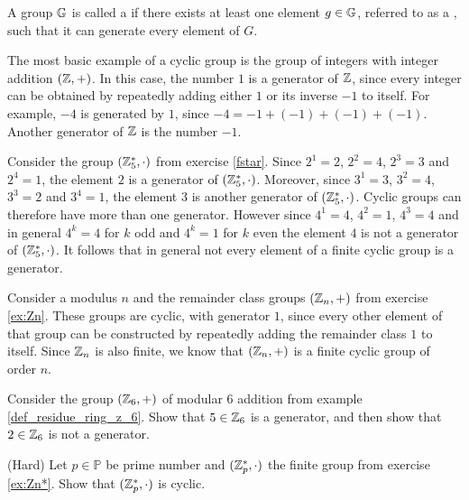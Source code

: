 \begin{definition}\label{cyclic-groups}
A group $\mathbb{G}$ is called a  if there exists at least one element $g\in \mathbb{G}$, referred to as a , such that it can generate every element of $G$.
\end{definition}

\begin{example}
\label{example:cyclic_group_of_integers} The most basic example of a cyclic group is the group of integers with integer addition $(\mathbb{Z},+)$. In this case, the number $1$ is a generator of $\mathbb{Z}$, since every integer can be obtained by repeatedly adding either $1$ or its inverse $-1$ to itself. For example, $-4$ is generated by $1$, since $-4=-1+(-1)+(-1)+(-1)$. Another generator of $\mathbb{Z}$ is the number $-1$.
\end{example}
\begin{example}
\label{example:cyclic_group_F5*} Consider the group $(\mathbb{Z}_5^*,\cdot)$ from exercise \ref{fstar}. Since $2^1=2$, $2^2=4$, $2^3=3$ and $2^4=1$, the element $2$ is a generator of $(\mathbb{Z}_5^*,\cdot)$. Moreover, since $3^1=3$, $3^2=4$, $3^3=2$ and $3^4=1$, the element $3$ is another generator of $(\mathbb{Z}_5^*,\cdot)$. Cyclic groups can therefore have more than one generator. However since $4^1=4$, $4^2=1$, $4^3=4$ and in general $4^k=4$ for $k$ odd and $4^k=1$ for $k$ even the element $4$ is not a generator of $(\mathbb{Z}_5^*,\cdot)$. It follows that in general not every element of a finite cyclic group is a generator.
\end{example}
\begin{example} Consider a modulus $n$ and the remainder class groups $(\mathbb{Z}_n,+)$ from exercise \ref{ex:Zn}. These groups are cyclic, with generator $1$, since every other element of that group can be constructed by repeatedly adding the remainder class $1$ to itself. Since $\mathbb{Z}_n$ is also finite, we know that $(\mathbb{Z}_n,+)$ is a finite cyclic group of order $n$.
\end{example}
\begin{exercise}
\label{example:cyclic_group_F6}
Consider the group $(\mathbb{Z}_6,+)$ of modular 6 addition from example \ref{def_residue_ring_z_6}. Show that $5\in \mathbb{Z}_6$ is a generator, and then show that $2\in \mathbb{Z}_6$ is not a generator.
\end{exercise}
\begin{exercise}\label{ex:modulus-prime-group}(Hard) Let $p\in\mathbb{P}$ be prime number and $(\mathbb{Z}_p^*,\cdot)$ the finite group from exercise \ref{ex:Zn*}. Show that $(\mathbb{Z}_p^*,\cdot)$ is cyclic.
\end{exercise}

